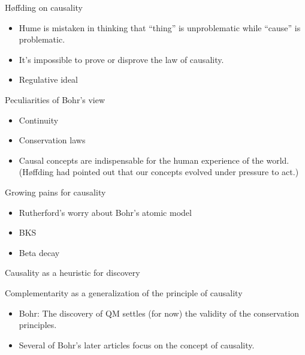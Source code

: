 \documentclass[fleqn]{beamer}
\begin{document}
\begin{frame}{Høffding on causality}

  \begin{itemize}
   \item Hume is mistaken in thinking that ``thing'' is unproblematic
    while ``cause'' is problematic.
  \item It's impossible to prove or disprove the law of causality.
  \item Regulative ideal
  \end{itemize}

\end{frame}  

\begin{frame}{Peculiarities of Bohr's view}

  \begin{itemize}
  \item Continuity
  \item Conservation laws
  \item Causal concepts are indispensable for the human experience of
    the world. (Høffding had pointed out that our concepts evolved
    under pressure to act.)
  \end{itemize}

\end{frame}

\begin{frame}{Growing pains for causality}

  \begin{itemize}
  \item Rutherford's worry about Bohr's atomic model
  \item BKS
  \item Beta decay
  \end{itemize}

\end{frame}

\begin{frame}{Causality as a heuristic for discovery}



\end{frame}

\begin{frame}{Complementarity as a generalization of the principle of
    causality}

  \begin{itemize}
  \item Bohr: The discovery of QM settles (for now) the validity of
    the conservation principles.
  \item Several of Bohr's later articles focus on the concept of
    causality.
  \end{itemize}

\end{frame}
\end{document}
